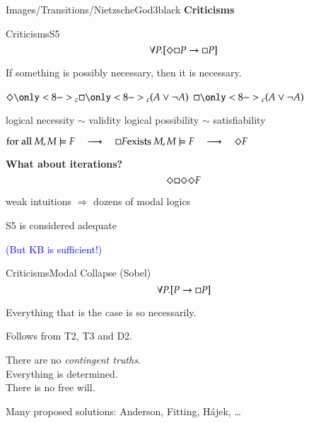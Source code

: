 \begin{transitionframe}{Images/Transitions/NietzscheGod3}{black}
\textbf{Criticisms}
\end{transitionframe}

\begin{frame}{Criticisms}{S5} \centering
$$
\forall P.[ \Diamond \Box P \rightarrow \Box P ] 
$$

\medskip

If something is possibly necessary, then it is necessary.

\pause

\bigskip


$
\pos\only<8->{_c} \nec\only<8->{_c} (A \vee \neg A)
$
\pause
\qquad 
$
\nec\only<8->{_c} (A \vee \neg A)
$

\pause

\bigskip

logical necessity $\sim$ validity
\hfill
logical possibility $\sim$ satisfiability

\pause 

\medskip

$ 
\textrm{for all } M, M \models F 
\quad \longrightarrow \quad
\nec F
\hfill
\textrm{exists } M, M \models F 
\quad \longrightarrow \quad
\pos F
$

\pause

\bigskip

\textbf{What about iterations?}
$$
\Diamond \Box \Diamond \Diamond F
$$

\medskip

\pause

weak intuitions $\Rightarrow$ dozens of modal logics

\medskip

\pause

\alert{S5 is considered adequate}

\medskip

\pause

\textcolor{blue}{(But KB is sufficient!)}


\end{frame}


\begin{frame}{Criticisms}{Modal Collapse (Sobel)} \centering
$$
\forall P.[ P \rightarrow \Box P ] 
$$

\medskip

Everything that is the case is so necessarily.

\pause

\medskip

Follows from T2, T3 and D2.

\pause

\medskip

There are no \emph{contingent truths}. \\ \pause
Everything is determined. \\ \pause
There is no free will. \\ \pause


\pause
\bigskip

Many proposed solutions: Anderson, Fitting, H\'ajek, \ldots
 
\end{frame}


